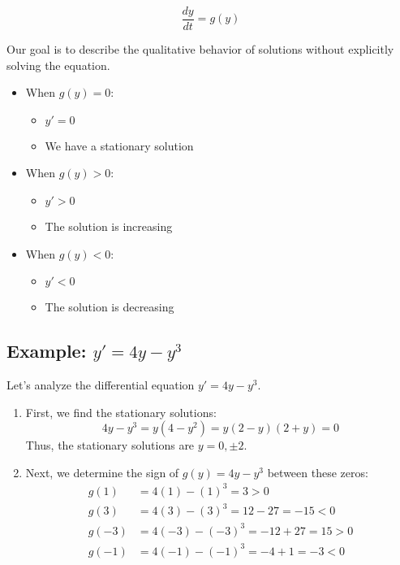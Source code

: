 \documentclass{article}
\begin{document}
\[
\frac{dy}{dt} = g(y)
\]

Our goal is to describe the qualitative behavior of solutions without explicitly solving the equation.

\begin{itemize}
    \item When $g(y) = 0$:
        \begin{itemize}
            \item $y' = 0$
            \item We have a stationary solution
        \end{itemize}
    
    \item When $g(y) > 0$:
        \begin{itemize}
            \item $y' > 0$
            \item The solution is increasing
        \end{itemize}
    
    \item When $g(y) < 0$:
        \begin{itemize}
            \item $y' < 0$
            \item The solution is decreasing
        \end{itemize}
\end{itemize}


\subsection*{Example: $y' = 4y - y^3$}

Let's analyze the differential equation $y' = 4y - y^3$.

\begin{enumerate}
    \item First, we find the stationary solutions:
    \[
    4y - y^3 = y(4 - y^2) = y(2-y)(2+y) = 0
    \]
    Thus, the stationary solutions are $y = 0, \pm 2$.

    \item Next, we determine the sign of $g(y) = 4y - y^3$ between these zeros:
    \begin{align*}
        g(1) &= 4(1) - (1)^3 = 3 > 0 \\
        g(3) &= 4(3) - (3)^3 = 12 - 27 = -15 < 0 \\
        g(-3) &= 4(-3) - (-3)^3 = -12 + 27 = 15 > 0 \\
        g(-1) &= 4(-1) - (-1)^3 = -4 + 1 = -3 < 0
    \end{align*}
\end{enumerate}
\end{document}
